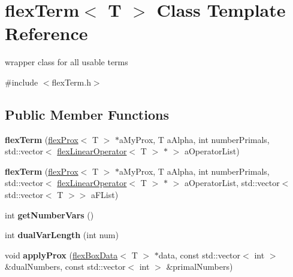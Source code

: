 \hypertarget{classflex_term}{}\section{flex\+Term$<$ T $>$ Class Template Reference}
\label{classflex_term}


wrapper class for all usable terms  




{\ttfamily \#include $<$flex\+Term.\+h$>$}

\subsection*{Public Member Functions}
\begin{DoxyCompactItemize}
\item 
\mbox{\label{classflex_term_a2b6dc0ff2bb0d78450448896ecce451b}} 
{\bfseries flex\+Term} (\hyperlink{classflex_prox}{flex\+Prox}$<$ T $>$ $\ast$a\+My\+Prox, T a\+Alpha, int number\+Primals, std\+::vector$<$ \hyperlink{classflex_linear_operator}{flex\+Linear\+Operator}$<$ T $>$ $\ast$ $>$ a\+Operator\+List)
\item 
\mbox{\label{classflex_term_a569960e0f60363ea86ede399db81ab39}} 
{\bfseries flex\+Term} (\hyperlink{classflex_prox}{flex\+Prox}$<$ T $>$ $\ast$a\+My\+Prox, T a\+Alpha, int number\+Primals, std\+::vector$<$ \hyperlink{classflex_linear_operator}{flex\+Linear\+Operator}$<$ T $>$ $\ast$ $>$ a\+Operator\+List, std\+::vector$<$ std\+::vector$<$ T $>$$>$ a\+F\+List)
\item 
\mbox{\label{classflex_term_aa1ae011dbf4aed8d85625c6dcc6881f0}} 
int {\bfseries get\+Number\+Vars} ()
\item 
\mbox{\label{classflex_term_a7f6de583dfb5d1a6d406fe33d7f51cb0}} 
int {\bfseries dual\+Var\+Length} (int num)
\item 
\mbox{\label{classflex_term_a35fbac82f3f94274bc3ab962ecc17259}} 
void {\bfseries apply\+Prox} (\hyperlink{classflex_box_data}{flex\+Box\+Data}$<$ T $>$ $\ast$data, const std\+::vector$<$ int $>$ \&dual\+Numbers, const std\+::vector$<$ int $>$ \&primal\+Numbers)
\end{DoxyCompactItemize}
